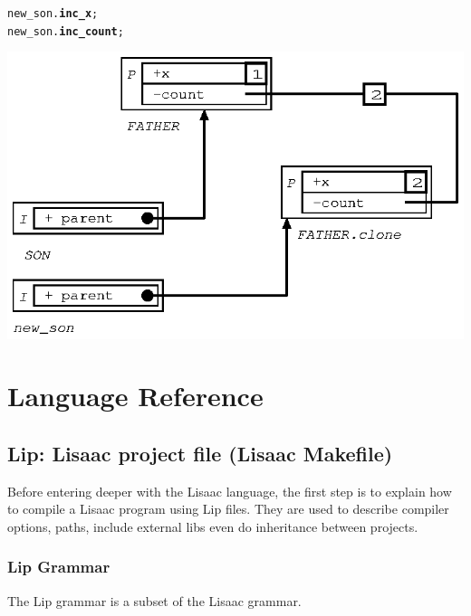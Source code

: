 \documentclass[11pt]{mybook}
\begin{document}
\begin{alltt}
  new\_son.{\bf{}inc\_x};
  new\_son.{\bf{}inc\_count};
\end{alltt}
\begin{center}
\includegraphics[scale=1.0]{figures/inherit_plus_4} 
\end{center}

\chapter{Language Reference}
\label{language_reference}

\section{Lip: Lisaac project file (Lisaac Makefile)}
\label{language_reference:lip}

Before entering deeper with the Lisaac language, the first step is to explain
how to compile a Lisaac program using Lip files. They are used to describe
compiler options, paths, include external libs even do inheritance between
projects.

\subsection{Lip Grammar}

The Lip grammar is a subset of the Lisaac grammar.
\end{document}
